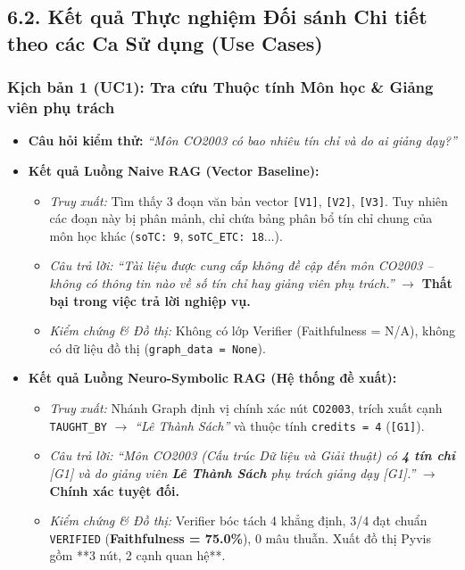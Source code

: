 \documentclass[a4paper,12pt]{article}
\begin{document}
\subsection{6.2. Kết quả Thực nghiệm Đối sánh Chi tiết theo các Ca Sử dụng (Use Cases)}

\subsubsection{Kịch bản 1 (UC1): Tra cứu Thuộc tính Môn học \& Giảng viên phụ trách}
\begin{itemize}[noitemsep]
    \item \textbf{Câu hỏi kiểm thử:} \textit{``Môn CO2003 có bao nhiêu tín chỉ và do ai giảng dạy?''}
    \item \textbf{Kết quả Luồng Naive RAG (Vector Baseline):}
    \begin{itemize}[noitemsep]
        \item \textit{Truy xuất:} Tìm thấy 3 đoạn văn bản vector \texttt{[V1]}, \texttt{[V2]}, \texttt{[V3]}. Tuy nhiên các đoạn này bị phân mảnh, chỉ chứa bảng phân bổ tín chỉ chung của môn học khác (\texttt{soTC: 9}, \texttt{soTC\_ETC: 18}...).
        \item \textit{Câu trả lời:} \textit{``Tài liệu được cung cấp không đề cập đến môn CO2003 -- không có thông tin nào về số tín chỉ hay giảng viên phụ trách.''} $\rightarrow$ \textbf{Thất bại trong việc trả lời nghiệp vụ.}
        \item \textit{Kiểm chứng \& Đồ thị:} Không có lớp Verifier (Faithfulness = N/A), không có dữ liệu đồ thị (\texttt{graph\_data = None}).
    \end{itemize}
    \item \textbf{Kết quả Luồng Neuro-Symbolic RAG (Hệ thống đề xuất):}
    \begin{itemize}[noitemsep]
        \item \textit{Truy xuất:} Nhánh Graph định vị chính xác nút \texttt{CO2003}, trích xuất cạnh \texttt{TAUGHT\_BY} $\rightarrow$ \textit{``Lê Thành Sách''} và thuộc tính \texttt{credits = 4} (\texttt{[G1]}).
        \item \textit{Câu trả lời:} \textit{``Môn CO2003 (Cấu trúc Dữ liệu và Giải thuật) có \textbf{4 tín chỉ} [G1] và do giảng viên \textbf{Lê Thành Sách} phụ trách giảng dạy [G1].''} $\rightarrow$ \textbf{Chính xác tuyệt đối.}
        \item \textit{Kiểm chứng \& Đồ thị:} Verifier bóc tách 4 khẳng định, 3/4 đạt chuẩn \texttt{VERIFIED} (\textbf{Faithfulness = 75.0\%}), 0 mâu thuẫn. Xuất đồ thị Pyvis gồm **3 nút, 2 cạnh quan hệ**.
    \end{itemize}
\end{itemize}
\end{document}
